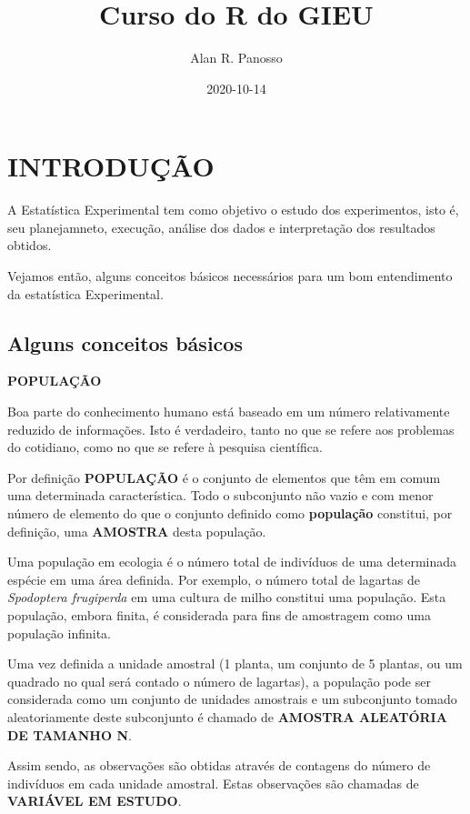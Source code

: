 \documentclass[
]{book}
\title{Curso do R do GIEU}
\author{Alan R. Panosso}
\date{2020-10-14}
\begin{document}
\maketitle

{
\setcounter{tocdepth}{1}
\tableofcontents
}
\hypertarget{introduuxe7uxe3o}{%
\chapter{INTRODUÇÃO}\label{introduuxe7uxe3o}}

A Estatística Experimental tem como objetivo o estudo dos experimentos, isto é, seu planejamneto, execução, análise dos dados e interpretação dos resultados obtidos.

Vejamos então, alguns conceitos básicos necessários para um bom entendimento da estatística Experimental.

\hypertarget{alguns-conceitos-buxe1sicos}{%
\section{Alguns conceitos básicos}\label{alguns-conceitos-buxe1sicos}}

\textbf{POPULAÇÃO}

Boa parte do conhecimento humano está baseado em um número relativamente reduzido de informações. Isto é verdadeiro, tanto no que se refere aos problemas do cotidiano, como no que se refere à pesquisa científica.

Por definição \textbf{POPULAÇÃO} é o conjunto de elementos que têm em comum uma determinada característica. Todo o subconjunto não vazio e com menor número de elemento do que o conjunto definido como \textbf{população} constitui, por definição, uma \textbf{AMOSTRA} desta população.

Uma população em ecologia é o número total de indivíduos de uma determinada espécie em uma área definida. Por exemplo, o número total de lagartas de \emph{Spodoptera frugiperda} em uma cultura de milho constitui uma população. Esta população, embora finita, é considerada para fins de amostragem como uma população infinita.

Uma vez definida a unidade amostral (1 planta, um conjunto de 5 plantas, ou um quadrado no qual será contado o número de lagartas), a população pode ser considerada como um conjunto de unidades amostrais e um subconjunto tomado aleatoriamente deste subconjunto é chamado de \textbf{AMOSTRA ALEATÓRIA DE TAMANHO N}.

Assim sendo, as observações são obtidas através de contagens do número de indivíduos em cada unidade amostral. Estas observações são chamadas de \textbf{VARIÁVEL EM ESTUDO}.
\end{document}
